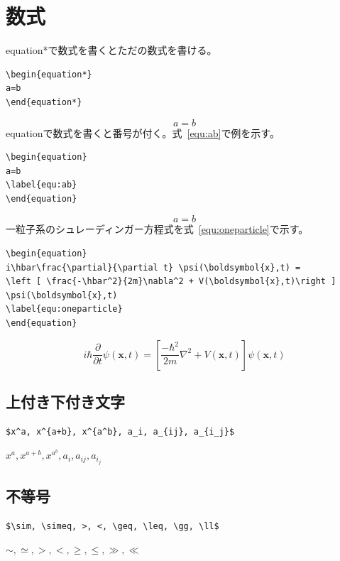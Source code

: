 \documentclass[a4j]{jsarticle}
\begin{document}
\section{数式}
equation*で数式を書くとただの数式を書ける。
\begin{verbatim}
\begin{equation*}
a=b
\end{equation*}
\end{verbatim}
\begin{equation*}
a=b
\end{equation*}
equationで数式を書くと番号が付く。式~\ref{equ:ab}で例を示す。
\begin{verbatim}
\begin{equation}
a=b
\label{equ:ab}
\end{equation}
\end{verbatim}
\begin{equation}
a=b
\label{equ:ab}
\end{equation}
一粒子系のシュレーディンガー方程式を式~\ref{equ:oneparticle}で示す。
\begin{verbatim}
\begin{equation}
i\hbar\frac{\partial}{\partial t} \psi(\boldsymbol{x},t) = 
\left [ \frac{-\hbar^2}{2m}\nabla^2 + V(\boldsymbol{x},t)\right ] \psi(\boldsymbol{x},t)
\label{equ:oneparticle}
\end{equation}
\end{verbatim}
\begin{equation}
i\hbar\frac{\partial}{\partial t} \psi(\boldsymbol{x},t) = 
\left [ \frac{-\hbar^2}{2m}\nabla^2 + V(\boldsymbol{x},t)\right ] \psi(\boldsymbol{x},t)
\label{equ:oneparticle}
\end{equation}

\subsection{上付き下付き文字}
\begin{verbatim}
$x^a, x^{a+b}, x^{a^b}, a_i, a_{ij}, a_{i_j}$
\end{verbatim}
$x^a, x^{a+b}, x^{a^b}, a_i, a_{ij}, a_{i_j}$

\subsection{不等号}
\begin{verbatim}
$\sim, \simeq, >, <, \geq, \leq, \gg, \ll$
\end{verbatim}
$\sim, \simeq, >, <, \geq, \leq, \gg, \ll$
\end{document}
